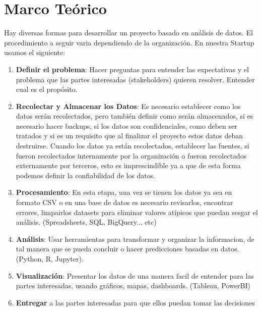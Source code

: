 \documentclass[12pt,a4paper,openright]{article}
\begin{document}
\section{Marco Te\'orico}
Hay diversas formas para desarrollar un proyecto basado en an\'alisis de datos. El procedimiento a seguir varia dependiendo de la organizaci\'on. En nuestra Startup usamos el siguiente:

\begin{enumerate}
    \item \textbf{Definir el problema}: Hacer preguntas para entender las expectativas y el problema que las partes interesadas (stakeholders) quieren resolver. Entender cual es el propósito.
    \item \textbf{Recolectar y Almacenar los Datos}: Es necesario establecer como los datos serán recolectados, pero también definir como serán almacenados, si es necesario hacer backups, si los datos son confidenciales, como deben ser tratados y si es un requisito que al finalizar el proyecto estos datos deban destruirse. Cuando los datos ya están recolectados, establecer las fuentes, si fueron recolectados internamente por la organización o fueron recolectados externamente por terceros, esto es imprescindible ya a que de esta forma podemos definir la confiabilidad de los datos. 
    \item \textbf{Procesamiento}: En esta etapa, una vez se tienen los datos ya sea en formato CSV o en una base de datos es necesario revisarlos, encontrar errores, limpairlos datasets para eliminar valores atípicos que puedan sesgar el análisis. (Spreadsheets, SQL, BigQuery... etc)
    \item \textbf{An\'alisis}: Usar herramientas para transformar y organizar la informacion, de tal manera que se pueda concluir o hacer predicciones basadas en datos. (Python, R, Jupyter).
    \item \textbf{Visualización}: Presentar los datos de una manera facil de entender para las partes interesadas, usando gráficos, mapas, dashboards. (Tableau, PowerBI)
    \item \textbf{Entregar} a las partes interesadas para que ellos puedan tomar las decisiones
\end{enumerate}
\end{document}
